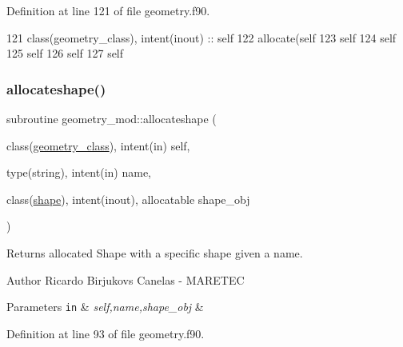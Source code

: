 Definition at line 121 of file geometry.\+f90.


\begin{DoxyCode}
121     \textcolor{keywordtype}{class}(geometry\_class), \textcolor{keywordtype}{intent(inout)} :: self
122     \textcolor{keyword}{allocate}(self%
123     self%
124     self%
125     self%
126     self%
127     self%
\end{DoxyCode}
\mbox{\label{namespacegeometry__mod_a571a294c2a1869259d21267005c32025}} 
\subsubsection{\texorpdfstring{allocateshape()}{allocateshape()}}
{\footnotesize\ttfamily subroutine geometry\+\_\+mod\+::allocateshape (\begin{DoxyParamCaption}\item[{class(\mbox{\hyperlink{structgeometry__mod_1_1geometry__class}{geometry\+\_\+class}}), intent(in)}]{self,  }\item[{type(string), intent(in)}]{name,  }\item[{class(\mbox{\hyperlink{structgeometry__mod_1_1shape}{shape}}), intent(inout), allocatable}]{shape\+\_\+obj }\end{DoxyParamCaption})\hspace{0.3cm}{\ttfamily [private]}}



Returns allocated Shape with a specific shape given a name. 

\begin{DoxyAuthor}{Author}
Ricardo Birjukovs Canelas -\/ M\+A\+R\+E\+T\+EC 
\end{DoxyAuthor}

\begin{DoxyParams}[1]{Parameters}
\mbox{\tt in}  & {\em self,name,shape\+\_\+obj} & \\
\hline
\end{DoxyParams}


Definition at line 93 of file geometry.\+f90.


